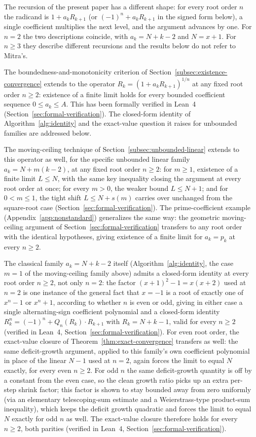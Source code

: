 \documentclass[11pt,a4paper]{amsart}
\theoremstyle{plain}
\theoremstyle{definition}
\theoremstyle{remark}
\begin{document}
The recursion of the present paper has a different shape: for every root order $n$ the radicand is $1+a_kR_{k+1}$ (or $(-1)^n+a_kR_{k+1}$ in the signed form below), a single coefficient multiplies the next level, and the argument advances by one. For $n=2$ the two descriptions coincide, with $a_k=N+k-2$ and $N=x+1$. For $n\ge 3$ they describe different recursions and the results below do not refer to Mitra's.

The boundedness-and-monotonicity criterion of Section~\ref{subsec:existence-convergence} extends to the operator $R_k = (1+a_k R_{k+1})^{1/n}$ at any fixed root order $n \ge 2$: existence of a finite limit holds for every bounded coefficient sequence $0 \le a_k \le A$. This has been formally verified in Lean~4 (Section~\ref{sec:formal-verification}). The closed-form identity of Algorithm~\ref{alg:identity} and the exact-value question it raises for unbounded families are addressed below.

The moving-ceiling technique of Section~\ref{subsec:unbounded-linear} extends to this operator as well, for the specific unbounded linear family $a_k=N+m(k-2)$, at any fixed root order $n \ge 2$: for $m \ge 1$, existence of a finite limit $L \le N$, with the same key inequality closing the argument at every root order at once; for every $m>0$, the weaker bound $L\le N+1$; and for $0<m\le 1$, the tight shift $L\le N+s(m)$ carries over unchanged from the square-root case (Section~\ref{sec:formal-verification}). The prime-coefficient example (Appendix~\ref{app:nonstandard}) generalizes the same way: the geometric moving-ceiling argument of Section~\ref{sec:formal-verification} transfers to any root order with the identical hypotheses, giving existence of a finite limit for $a_k=p_k$ at every $n\ge 2$.

The classical family $a_k=N+k-2$ itself (Algorithm~\ref{alg:identity}, the case $m=1$ of the moving-ceiling family above) admits a closed-form identity at every root order $n\ge 2$, not only $n=2$: the factor $(x+1)^2-1=x(x+2)$ used at $n=2$ is one instance of the general fact that $x=-1$ is a root of exactly one of $x^n-1$ or $x^n+1$, according to whether $n$ is even or odd, giving in either case a single alternating-sign coefficient polynomial and a closed-form identity $R_k^n=(-1)^n+Q_n(R_k)\cdot R_{k+1}$ with $R_k=N+k-1$, valid for every $n\ge 2$ (verified in Lean~4, Section~\ref{sec:formal-verification}). For even root order, the exact-value closure of Theorem~\ref{thm:exact-convergence} transfers as well: the same deficit-growth argument, applied to this family's own coefficient polynomial in place of the linear $N-1$ used at $n=2$, again forces the limit to equal $N$ exactly, for every even $n\ge 2$. For odd $n$ the same deficit-growth quantity is off by a constant from the even case, so the clean growth ratio picks up an extra per-step shrink factor; this factor is shown to stay bounded away from zero uniformly (via an elementary telescoping-sum estimate and a Weierstrass-type product-sum inequality), which keeps the deficit growth quadratic and forces the limit to equal $N$ exactly for odd $n$ as well. The exact-value closure therefore holds for every $n\ge 2$, both parities (verified in Lean~4, Section~\ref{sec:formal-verification}).
\end{document}
